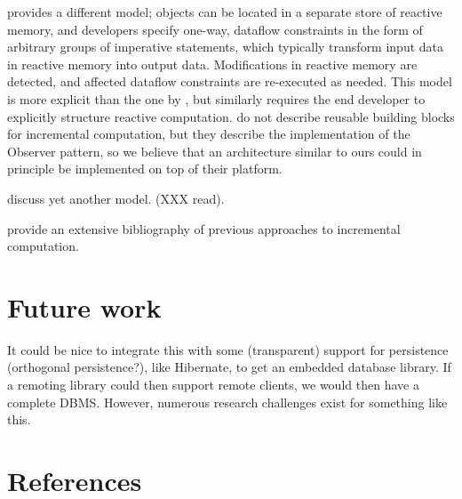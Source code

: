 \documentclass{article}
\begin{document}
\citet{Demetrescu11} provides a different model; objects can be located
in a separate store of reactive memory, and developers specify one-way,
dataflow constraints in the form of arbitrary groups of imperative
statements, which typically transform input data in reactive memory into
output data. Modifications in reactive memory are detected, and affected
dataflow constraints are re-executed as needed. This model is more
explicit than the one by \citet{Hammer11}, but similarly requires the
end developer to explicitly structure reactive computation.
\citeauthor{Demetrescu11} do not describe reusable building blocks for
incremental computation, but they describe the implementation of the
Observer pattern, so we believe that an architecture similar to ours
could in principle be implemented on top of their platform.

\citet{Burckhardt11} discuss yet another model. (XXX read).

\citet{Ramalingam93} provide an extensive bibliography of previous
approaches to incremental computation.

\section{Future work}

It could be nice to integrate this with some (transparent) support for
persistence (orthogonal persistence?), like Hibernate, to get an
embedded database library. If a remoting library could then support
remote clients, we would then have a complete DBMS. However, numerous
research challenges exist for something like this.

\section{References}


\end{document}

